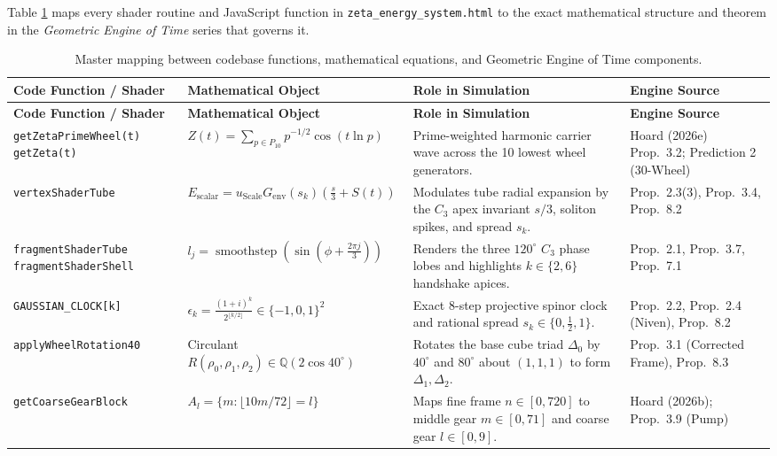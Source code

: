 \documentclass[11pt, a4paper]{article}
\begin{document}
Table \ref{tab:master-map} maps every shader routine and JavaScript function in \texttt{zeta\_energy\_system.html} to the exact mathematical structure and theorem in the \textit{Geometric Engine of Time} series that governs it.

\begin{longtable}{@{}p{3.6cm}p{3.8cm}p{4.2cm}p{3.4cm}@{}}
\caption{Master mapping between codebase functions, mathematical equations, and Geometric Engine of Time components.} \label{tab:master-map} \\
\toprule
\textbf{Code Function / Shader} & \textbf{Mathematical Object} & \textbf{Role in Simulation} & \textbf{Engine Source} \\
\midrule
\endfirsthead
\toprule
\textbf{Code Function / Shader} & \textbf{Mathematical Object} & \textbf{Role in Simulation} & \textbf{Engine Source} \\
\midrule
\endhead
\bottomrule
\endfoot
\texttt{getZetaPrimeWheel(t)} \newline \texttt{getZeta(t)} & $Z(t) = \sum_{p \in P_{10}} p^{-1/2}\cos(t\ln p)$ & Prime-weighted harmonic carrier wave across the 10 lowest wheel generators. & Hoard (2026e) Prop.~3.2; Prediction 2 (30-Wheel) \\
\addlinespace
\texttt{vertexShaderTube} & $E_{\text{scalar}} = u_{\text{Scale}} G_{\text{env}}(s_k)\left(\frac{s}{3} + S(t)\right)$ & Modulates tube radial expansion by the $C_3$ apex invariant $s/3$, soliton spikes, and spread $s_k$. & Prop.~2.3(3), Prop.~3.4, Prop.~8.2 \\
\addlinespace
\texttt{fragmentShaderTube} \newline \texttt{fragmentShaderShell} & $l_j = \operatorname{smoothstep}\!\left(\sin(\phi + \frac{2\pi j}{3})\right)$ & Renders the three $120^\circ$ $C_3$ phase lobes and highlights $k \in \{2,6\}$ handshake apices. & Prop.~2.1, Prop.~3.7, Prop.~7.1 \\
\addlinespace
\texttt{GAUSSIAN\_CLOCK[k]} & $\epsilon_k = \frac{(1+i)^k}{2^{\lfloor k/2\rfloor}} \in \{-1,0,1\}^2$ & Exact 8-step projective spinor clock and rational spread $s_k \in \{0, \frac{1}{2}, 1\}$. & Prop.~2.2, Prop.~2.4 (Niven), Prop.~8.2 \\
\addlinespace
\texttt{applyWheelRotation40} & Circulant $R(\rho_0, \rho_1, \rho_2) \in \mathbb{Q}(2\cos 40^\circ)$ & Rotates the base cube triad $\Delta_0$ by $40^\circ$ and $80^\circ$ about $(1,1,1)$ to form $\Delta_1, \Delta_2$. & Prop.~3.1 (Corrected Frame), Prop.~8.3 \\
\addlinespace
\texttt{getCoarseGearBlock} & $A_l = \{m : \lfloor 10m/72\rfloor = l\}$ & Maps fine frame $n \in [0,720]$ to middle gear $m \in [0,71]$ and coarse gear $l \in [0,9]$. & Hoard (2026b); Prop.~3.9 (Pump) \\

\end{longtable}
\end{document}
